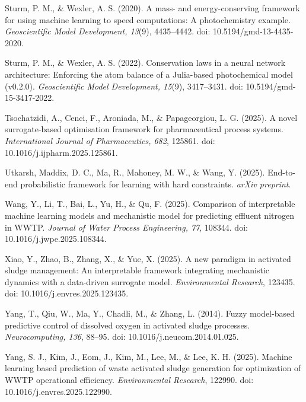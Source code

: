 \documentclass[a4paper,fleqn]{cas-sc}
\begin{document}
\noindent Sturm, P. M., \& Wexler, A. S. (2020). A mass- and energy-conserving framework for using machine learning to speed computations: A photochemistry example. \textit{Geoscientific Model Development, 13}(9), 4435--4442. doi: 10.5194/gmd-13-4435-2020.

\noindent Sturm, P. M., \& Wexler, A. S. (2022). Conservation laws in a neural network architecture: Enforcing the atom balance of a Julia-based photochemical model (v0.2.0). \textit{Geoscientific Model Development, 15}(9), 3417--3431. doi: 10.5194/gmd-15-3417-2022.

\noindent Tsochatzidi, A., Cenci, F., Aroniada, M., \& Papageorgiou, L. G. (2025). A novel surrogate-based optimisation framework for pharmaceutical process systems. \textit{International Journal of Pharmaceutics, 682}, 125861. doi: 10.1016/j.ijpharm.2025.125861.

\noindent Utkarsh, Maddix, D. C., Ma, R., Mahoney, M. W., \& Wang, Y. (2025). End-to-end probabilistic framework for learning with hard constraints. \textit{arXiv preprint}.

\noindent Wang, Y., Li, T., Bai, L., Yu, H., \& Qu, F. (2025). Comparison of interpretable machine learning models and mechanistic model for predicting effluent nitrogen in WWTP. \textit{Journal of Water Process Engineering, 77}, 108344. doi: 10.1016/j.jwpe.2025.108344.

\noindent Xiao, Y., Zhao, B., Zhang, X., \& Yue, X. (2025). A new paradigm in activated sludge management: An interpretable framework integrating mechanistic dynamics with a data-driven surrogate model. \textit{Environmental Research}, 123435. doi: 10.1016/j.envres.2025.123435.

\noindent Yang, T., Qiu, W., Ma, Y., Chadli, M., \& Zhang, L. (2014). Fuzzy model-based predictive control of dissolved oxygen in activated sludge processes. \textit{Neurocomputing, 136}, 88--95. doi: 10.1016/j.neucom.2014.01.025.

\noindent Yang, S. J., Kim, J., Eom, J., Kim, M., Lee, M., \& Lee, K. H. (2025). Machine learning based prediction of waste activated sludge generation for optimization of WWTP operational efficiency. \textit{Environmental Research}, 122990. doi: 10.1016/j.envres.2025.122990.
\end{document}
